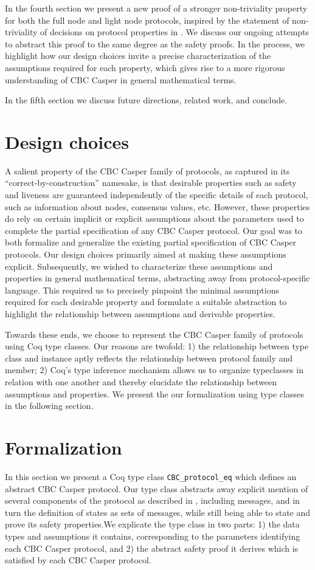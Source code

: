 \documentclass[runningheads]{llncs}
\begin{document}
In the fourth section we present a new proof of a stronger non-triviality property for both the full node and light node protocols, inspired by the statement of non-triviality of decisions on protocol properties in \cite{CBCfull}. We discuss our ongoing attempts to abstract this proof to the same degree as the safety proofs. In the process, we highlight how our design choices invite a precise characterization of the assumptions required for each property, which gives rise to a more rigorous understanding of CBC Casper in general mathematical terms.  

In the fifth section we discuss future directions, related work, and conclude. 

\section{Design choices} 
A salient property of the CBC Casper family of protocols, as captured in its ``correct-by-construction'' namesake, is that desirable properties such as safety and liveness are guaranteed independently of the specific details of each protocol, such as information about nodes, consensus values, etc. However, these properties do rely on certain implicit or explicit assumptions about the parameters used to complete the partial specification of any CBC Casper protocol. Our goal was to both formalize and generalize the existing partial specification of CBC Casper protocols. Our design choices primarily aimed at making these assumptions explicit. Subsequently, we wished to characterize these assumptions and properties in general mathematical terms, abstracting away from protocol-specific language. This required us to precisely pinpoint the minimal assumptions required for each desirable property and formulate a suitable abstraction to highlight the relationship between assumptions and derivable properties. 

Towards these ends, we choose to represent the CBC Casper family of protocols using Coq type classes. Our reasons are twofold: 1) the relationship between type class and instance aptly reflects the relationship between protocol family and member; 2) Coq's type inference mechanism allows us to organize typeclasses in relation with one another and thereby elucidate the relationship between assumptions and properties. We present the our formalization using type classes in the following section. 

\section{Formalization}
\label{sec:formalization}
In this section we present a Coq type class \verb|CBC_protocol_eq| which defines an abstract CBC Casper protocol. Our type class abstracts away explicit mention of several components of the protocol as described in \cite{CBCfull}, including messages, and in turn the definition of states as sets of messages, while still being able to state and prove its safety properties.We explicate the type class in two parts: 1) the data types and assumptions it contains, corresponding to the parameters identifying each CBC Casper protocol, and 2) the abstract safety proof it derives which is satisfied by each CBC Casper protocol.
\end{document}
